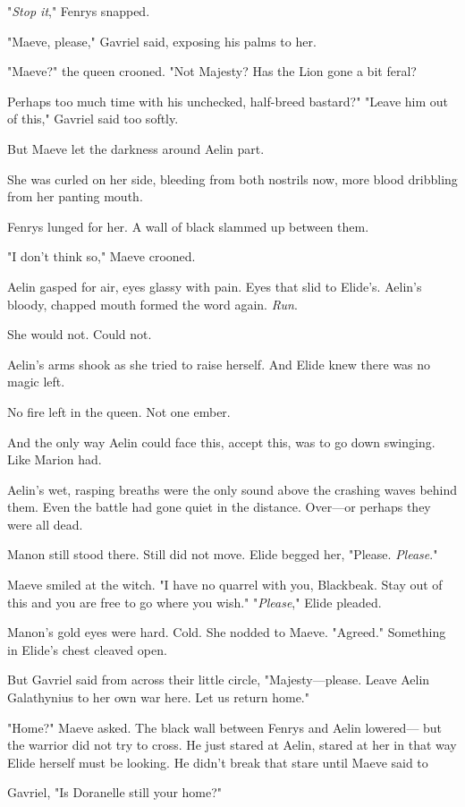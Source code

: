 "\emph{Stop it}," Fenrys snapped.

"Maeve, please," Gavriel said, exposing his palms to her.

"Maeve?" the queen crooned. "Not Majesty? Has the Lion gone a bit feral?

Perhaps too much time with his unchecked, half-breed bastard?" "Leave him out of this," Gavriel said too softly.

But Maeve let the darkness around Aelin part.

She was curled on her side, bleeding from both nostrils now, more blood dribbling from her panting mouth.

Fenrys lunged for her. A wall of black slammed up between them.

"I don't think so," Maeve crooned.

Aelin gasped for air, eyes glassy with pain. Eyes that slid to Elide's. Aelin's bloody, chapped mouth formed the word again. \emph{Run}.

She would not. Could not.

Aelin's arms shook as she tried to raise herself. And Elide knew there was no magic left.

No fire left in the queen. Not one ember.

And the only way Aelin could face this, accept this, was to go down swinging. Like Marion had.

Aelin's wet, rasping breaths were the only sound above the crashing waves behind them. Even the battle had gone quiet in the distance. Over---or perhaps they were all dead.

Manon still stood there. Still did not move. Elide begged her, "Please.
\emph{Please}."

Maeve smiled at the witch. "I have no quarrel with you, Blackbeak. Stay out of this and you are free to go where you wish." "\emph{Please}," Elide pleaded.

Manon's gold eyes were hard. Cold. She nodded to Maeve. "Agreed." Something in Elide's chest cleaved open.

But Gavriel said from across their little circle, "Majesty---please. Leave Aelin Galathynius to her own war here. Let us return home."

"Home?" Maeve asked. The black wall between Fenrys and Aelin lowered--- but the warrior did not try to cross. He just stared at Aelin, stared at her in that way Elide herself must be looking. He didn't break that stare until Maeve said to

Gavriel, "Is Doranelle still your home?"

